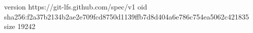 version https://git-lfs.github.com/spec/v1
oid sha256:f2a37b2134b2ae2e709fcd8750d1139ffb7d8d404a6e786c754ea5062c421835
size 19242
